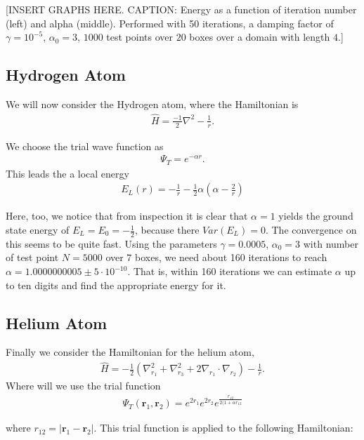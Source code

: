 [INSERT GRAPHS HERE. CAPTION: Energy as a function of iteration number (left) and alpha (middle). Performed with 50 iterations, a damping factor of $\gamma = 10^{-5}$, $\alpha_0 = 3$, $1000$ test points over $20$ boxes over a domain with length $4$.] 
  

\subsection{Hydrogen Atom}
We will now consider the Hydrogen atom, where the Hamiltonian is
\begin{align}
  \hat{H} = \frac{-1}{2}\nabla^2 - \frac{1}{r}.
\end{align}

We choose the trial wave function as
  \begin{align}
    \Psi_T = e^{-\alpha r}.
  \end{align}
This leads the a local energy
  \begin{align}
    E_L(r) = - \frac{1}{r} - \frac{1}{2}\alpha(\alpha - \frac{2}{r})
  \end{align}

Here, too, we notice that from inspection it is clear that $\alpha = 1$ yields the ground state energy of $E_L = E_0 = -\frac{1}{2}$, because there $Var(E_L) = 0$. The convergence on this seems to be quite fast. Using the parameters $\gamma = 0.0005$, $\alpha_0 = 3$ with number of test point $N = 5000$ over $7$ boxes, we need about 160 iterations to reach $\alpha = 1.0000000005 \pm 5 \cdot 10^{-10}$. That is, within 160 iterations we can estimate $\alpha$ up to ten digits and find the appropriate energy for it. 




\subsection{Helium Atom}
Finally we consider the Hamiltonian for the helium atom,
\begin{align}
  \hat{H} = -\frac{1}{2}(\nabla_{r_1}^2 + \nabla_{r_3}^2 + 2\nabla_{r_1}\cdot \nabla_{r_2}) - \frac{1}{r}.
\end{align}
Where will we use the trial function
  \begin{align}
    \Psi_T (\textbf{r}_1,\textbf{r}_2) = e^{2r_1}e^{2r_2}e^{\frac{r_{12}}{2(1+\alpha r_{12}}}
  \end{align}

where $r_{12} = |\textbf{r}_1 - \textbf{r}_2 |$. This trial function is applied to the following Hamiltonian:


